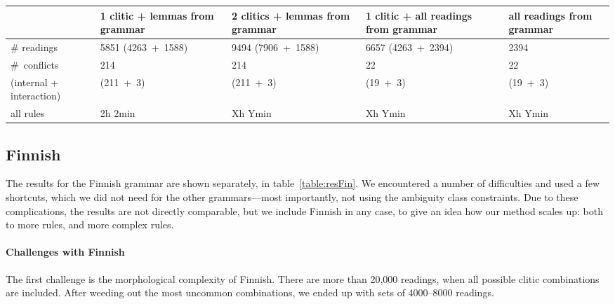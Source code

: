 \begin{table*}[t!]
\centering
\begin{tabular}{|p{3.15cm}|p{2.55cm}|p{2.55cm}|p{2.7cm}|p{2.1cm}|}

\hline
              & 1 clitic + 
                lemmas from 
                 grammar & 2 clitics 
                           + lemmas from 
                              grammar & 1 clitic +
                                          all readings 
                                          from grammar    & all readings from grammar \\ \hline
\# readings   & 5851 (4263~+~1588)
                       & 9494
                       (7906~+~1588) & 6657 (4263~+~2394) & 2394  \\ \hline
\#~conflicts  & 214    & 214         & 22                 & 22 \\
(internal + 
 interaction) & (211~+~3) & (211~+~3) & (19~+~3)        &  (19~+~3)  \\ \hline

\clock{} all 
       rules & 2h 2min     & Xh Ymin   & Xh Ymin &  Xh Ymin \\ \hline


\end{tabular}
\caption{Results for Finnish (1185 rules).}
\label{table:resFin}
\end{table*}

\subsection{Finnish} 

The results for the Finnish grammar are shown separately, in table~\ref{table:resFin}. We encountered a number of difficulties and used a few shortcuts, which we did not need for the other grammars---most importantly, not using the ambiguity class constraints. Due to these complications, the results are not directly comparable, but we include Finnish in any case, 
to give an idea how our method scales up: both to more rules, and more complex rules.

\paragraph{Challenges with Finnish} The first challenge is the morphological complexity of Finnish.
There are more than 20,000 readings, when all possible clitic combinations are included.
After weeding out the most uncommon combinations, we ended up with sets of 4000--8000 readings.

